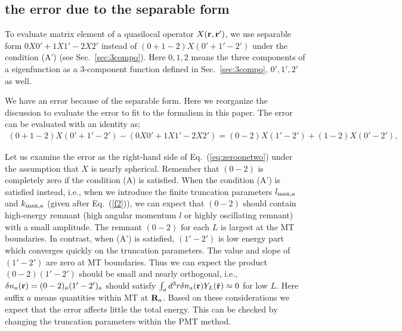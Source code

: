 \documentclass[twocolumn,showpacs,preprintnumbers,amsmath,amssymb,floatfix]{revtex4-1}
\newcommand{\bfr}{{\bf r}}
\newcommand{\bfR}{{\bf R}}
\newcommand{\req}[1]{\mbox{Eq.~\!(\ref{#1})}}
\newcommand{\refsec}[1]{\mbox{Sec.~\!\ref{#1}}}
\begin{document}
\appendix
\begin{widetext}
\section{the error due to the separable form}
\label{sec:zeroonetwo}
To evaluate matrix element of a quasilocal operator
$X(\bfr,\bfr')$, we use separable form $0X 0'+1 X 1'-2 X 2'$
instead of $(0+1-2)X(0'+1'-2')$ under the condition (A') 
(see \refsec{sec:3compo}). Here $0,1,2$ means the three components of 
a eigenfunction as a 3-component function defined in
\refsec{sec:3compo}, $0',1',2'$ as well.

We have an error because of the separable form.
Here we reorganize the discussion to evaluate the error
\cite{soler89,PAW} to fit to the formalism in this paper.
The error can be evaluated with an identity as;
\begin{eqnarray}
(0+1-2)X(0'+1'-2')-(0X 0'+1 X 1'-2 X 2') 
= (0-2)X(1'-2')+(1-2)X(0'-2'), \label{eq:zeroonetwo}
\end{eqnarray}
\end{widetext}
Let us examine the error as the right-hand side of
\req{eq:zeroonetwo} under the assumption that $X$ is nearly spherical.
Remember that $(0-2)$ is completely zero if the condition (A) is
satisfied. When the condition (A') is satisfied instead, 
i.e., when we introduce the finite truncation parameters 
$l_{{\rm max},a}$ and $k_{{\rm max},a}$ (given after \req{f2}), 
we can expect that $(0-2)$ should contain high-energy remnant
(high angular momentum $l$ or highly oscillating remnant) with a small amplitude.
The remnant $(0-2)$ for each $L$ is largest at the MT boundaries.
In contrast, when (A') is satisfied, $(1'-2')$ is low energy part which  
converges quickly on the truncation parameters. 
The value and slope of $(1'-2')$ are zero at MT boundaries.
Thus we can expect the product $(0-2)(1'-2')$ should be small and
nearly orthogonal, i.e.,
$\delta n_a(\bfr)=(0-2)_a(1'-2')_a$ should satisfy $\int_a d^3 r\delta
n_a(\bfr)Y_L(\hat{\bfr}) \approx 0$ for low $L$.
Here suffix $a$ means quantities within MT at $\bfR_a$.
Based on these considerations we expect that the error affects little 
the total energy.
This can be checked by changing the truncation parameters within the PMT method.
\end{document}
